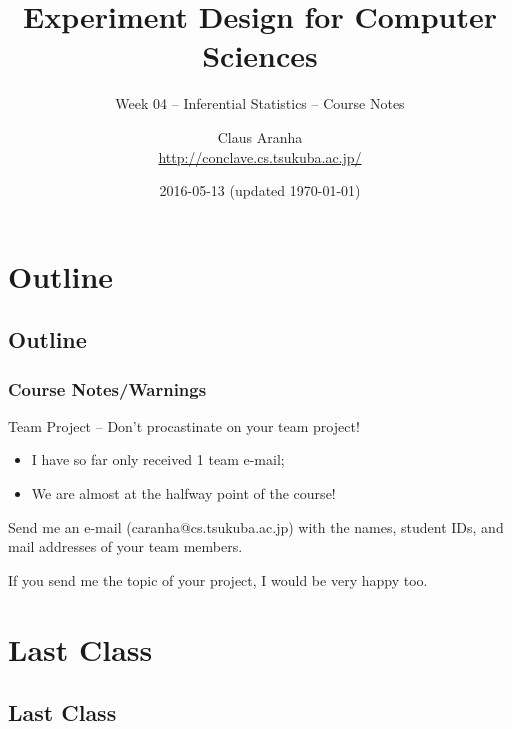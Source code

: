 \documentclass[t]{beamer}
\title[]{Experiment Design for Computer Sciences}
\subtitle[]{Week 04 -- Inferential Statistics -- Course Notes}
\author[]{Claus Aranha\\{\footnotesize \url{http://conclave.cs.tsukuba.ac.jp/}}}
\institute{Computer Science Department}
\date{2016-05-13 (updated \today)}
\begin{document}
\section{Outline}
\subsection{Outline}
\begin{frame}
  \maketitle
\end{frame}

\begin{frame}
  \frametitle{Course Notes/Warnings}

  \begin{alertblock}{Team Project -- Don't procastinate on your team project!}
    \begin{itemize}
      \item I have so far only received 1 team e-mail;
      \item We are almost at the halfway point of the course! 
    \end{itemize}
  \end{alertblock}

  \vfill

  Send me an e-mail (caranha@cs.tsukuba.ac.jp) with the names, student
  IDs, and mail addresses of your team members.

  \vfill

  If you send me the topic of your project, I would be very happy too.
\end{frame}

\section{Last Class}
\subsection{Last Class}
\end{document}
